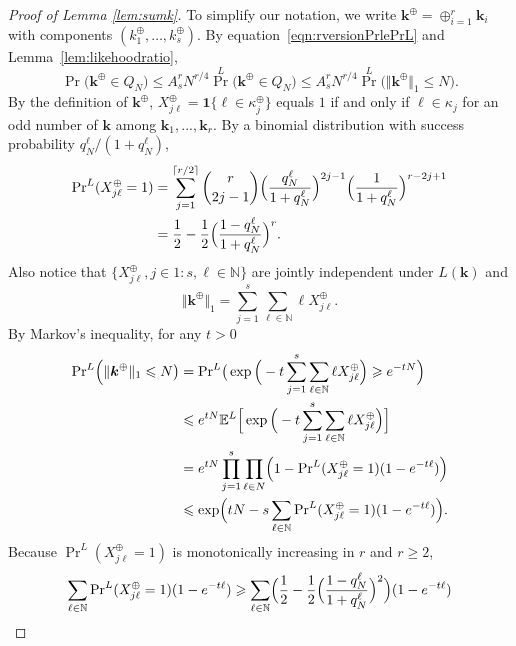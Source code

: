 \documentclass{article}
\theoremstyle{definition}
\renewcommand{\leq}{\leqslant}
\renewcommand{\geq}{\geqslant}
\newcommand{\natu}{\mathbb{N}}
\newcommand{\bsk}{\boldsymbol{k}}
\newcommand{\bsone}{\boldsymbol{1}}
\newcommand{\e}{\mathbb{E}}
\begin{document}
\begin{proof}[Proof of Lemma \ref{lem:sumk}]
To simplify our notation, we write $\bsk^\oplus=\oplus_{i=1}^r\bsk_i$ with components $(k^\oplus_1,\dots, k^\oplus_s)$. By equation~\eqref{eqn:rversionPrlePrL} and Lemma~\ref{lem:likehoodratio},
    \begin{equation}\label{eqn:PrlePrLforsumk}
        \Pr\big(\bsk^\oplus\in Q_N\big)\leq A^r_s N^{r/4}{\textstyle\Pr}^L\big(\bsk^\oplus\in Q_N\big)\leq A^r_s N^{r/4}{\textstyle\Pr}^L\big(\Vert\bsk^\oplus\Vert_1\leq N\big).
    \end{equation}
    By the definition of $\bsk^\oplus$, $X^\oplus_{j\ell}=\bsone\{\ell\in \kappa^\oplus_j\}$ equals $1$ if and only if $\ell\in \kappa_j$ for an odd number of $\bsk$ among $\bsk_1,...,\bsk_r$.
    By a binomial distribution with success probability $q_N^\ell/(1+q_N^\ell)$,
    \begin{align}\label{eqn:oddbinomial}
        {\textstyle\Pr}^L(X^\oplus_{j\ell}=1)&=\sum_{j=1}^{\lceil r/2\rceil}{r\choose 2j-1}\Big(\frac{q_N^\ell}{1+q_N^\ell}\Big)^{2j-1}\Big(\frac{1}{1+q_N^\ell}\Big)^{r-2j+1}\\
        &=\frac{1}{2}-\frac{1}{2}\Bigl(\frac{1-q_N^\ell}{1+q_N^\ell}\Bigr)^r. \nonumber
    \end{align}
    Also notice that $\{X^\oplus_{j\ell}, j\in1{:}s, \ell\in \natu\}$ are jointly independent under $L(\bsk)$ and $$\Vert\bsk^\oplus\Vert_1=\sum_{j=1}^s\sum_{\ell\in\natu}\ell X^\oplus_{j\ell}.$$
 By Markov's inequality, for any $t>0$
    \begin{align}\label{eqn:chernoffbound}
        {\textstyle\Pr}^L\Big(\Vert\bsk^\oplus\Vert_1\leq N\big)&={\textstyle\Pr}^L\big(\exp\Big(-t\sum_{j=1}^s\sum_{\ell\in\natu}\ell X^\oplus_{j\ell}\Big)\geq e^{-tN}\Big)\\
        & \leq e^{tN} \e^L\Big[\exp\Big(-t\sum_{j=1}^s\sum_{\ell\in\natu}\ell X^\oplus_{j\ell}\Big)\Big]\nonumber\\
        & =e^{tN}\prod_{j=1}^s\prod_{\ell\in N}\Bigl(1-{\textstyle\Pr}^L(X^\oplus_{j\ell}=1)(1-e^{-t\ell })\Bigr)\nonumber\\
        &\leq \exp\Bigl(tN-s\sum_{\ell\in\natu}{\textstyle\Pr}^L(X^\oplus_{j\ell}=1)(1-e^{-t\ell })\Bigr).\nonumber
    \end{align}
    Because ${\textstyle\Pr}^L(X^\oplus_{j\ell}=1)$ is monotonically increasing in $r$ and $r\geq 2$,
    \begin{align*}
        \sum_{\ell\in\natu}{\textstyle\Pr}^L(X^\oplus_{j\ell}=1)(1-e^{-t\ell })
        &\geq \sum_{\ell\in\natu}\Bigl(\frac{1}{2}-\frac{1}{2}\Bigl(\frac{1-q_N^\ell}{1+q_N^\ell}\Bigr)^2\Bigr)(1-e^{-t\ell })\\

\end{align*}
\end{proof}
\end{document}
